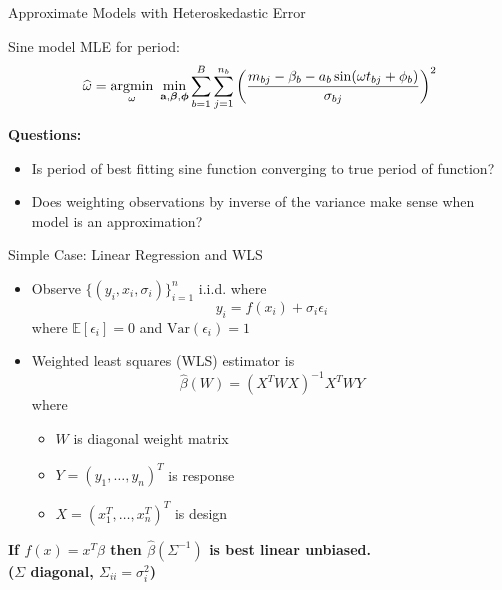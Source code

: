 \documentclass[12pt]{beamer}
\newcommand{\argmin}[1]{\underset{#1}{\operatorname{argmin}}\text{ }}
\newcommand{\Var}{\text{Var}}
\newcommand{\E}{\mathbb{E}}
\newcommand{\V}[1]{{\bm{\mathbf{\MakeLowercase{#1}}}}} %
\begin{document}
\begin{frame}{Approximate Models with Heteroskedastic Error}

  Sine model MLE for period:
  \begin{equation*}
    \widehat{\omega} = \argmin{\omega} \min_{\V{a},\V{\beta},\V{\phi}} \sum_{b=1}^B \sum_{j=1}^{n_b} \left(\frac{m_{bj} - \beta_{b} - a_b\sin(\omega t_{bj} + \phi_b)}{\sigma_{bj}}\right)^2
  \end{equation*}
  
  
  

  \textbf{Questions:}
  \begin{itemize}
  \item Is period of best fitting sine function converging to true period of function?\\
  \item Does weighting observations by inverse of the variance make sense when model is an approximation?
  \end{itemize}
  
\end{frame}

\begin{frame}{Simple Case: Linear Regression and WLS}
\begin{itemize}
\item Observe $\{(y_i,x_i,\sigma_i)\}_{i=1}^n$ i.i.d. where
  \begin{equation*}
    y_i = f(x_i) + \sigma_i\epsilon_i 
  \end{equation*}
  where $\E[\epsilon_i] = 0$  and $\Var(\epsilon_i) = 1$
\item Weighted least squares (WLS) estimator is
  \begin{equation*}
    \widehat{\beta}(W) = (X^TWX)^{-1}X^TWY
  \end{equation*}
  where
  \begin{itemize}
    \item $W$ is diagonal weight matrix
    \item $Y = (y_1,\ldots,y_n)^T$ is response
    \item $X = (x_1^T,\ldots,x_n^T)^T$ is design
  \end{itemize}
\end{itemize}

\begin{center}
\textbf{If $f(x) = x^T\beta$ then $\widehat{\beta}(\Sigma^{-1})$ is best linear unbiased.\\ ($\Sigma$ diagonal, $\Sigma_{ii} = \sigma_i^2$)}
\end{center}
\end{frame}
\end{document}
